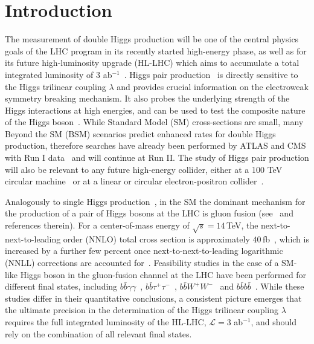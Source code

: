 \section{Introduction}

The measurement of double Higgs production will be one of the central
physics goals of the LHC program in its recently started high-energy
phase, as well as for its future high-luminosity upgrade (HL-LHC)
which aims to accumulate a total integrated
luminosity of 3 ab$^{-1}$~\cite{ATLAS:2013hta,CMS:2013xfa}.
%
Higgs pair production~\cite{baglio} is directly sensitive to the
Higgs trilinear coupling $\lambda$ and 
provides crucial
information on the electroweak symmetry breaking mechanism.
%
It also probes the underlying strength of the Higgs interactions
at high energies, and can be used to test the composite nature of the 
Higgs boson~\cite{Giudice:2007fh,Contino:2010mh}.
%
While Standard Model (SM) cross-sections are small,
many Beyond the SM (BSM)
scenarios predict enhanced rates for double Higgs production, therefore searches have already been performed by ATLAS and CMS with Run I data~\cite{Aad:2015xja,Aad:2015uka,Aad:2014yja,Khachatryan:2015yea,Chatrchyan:2011wt}
and will continue at Run II.
%
The study of Higgs pair production will also be relevant to
any future high-energy 
collider, either at a 100 TeV circular machine~\cite{Arkani-Hamed:2015vfh,Barr:2014sga,Papaefstathiou:2015iba,Azatov:2015oxa} or at
a linear or circular electron-positron collider~\cite{Contino:2013gna}.

Analogously to single Higgs production~\cite{Dittmaier:2012vm}, 
in the SM the dominant mechanism for the production of a pair of
Higgs bosons at the LHC is 
gluon fusion (see~\cite{baglio,Frederix:2014hta} and
references therein).
%
For a center-of-mass energy of $\sqrt{s} = 14\,$TeV, the
next-to-next-to-leading order (NNLO)
total cross section is approximately $40\,$fb~\cite{deFlorian:2013jea},
which is increased by a further few percent once
next-to-next-to-leading logarithmic
(NNLL) corrections
are accounted for~\cite{deFlorian:2015moa}.
%
Feasibility studies in the case of a SM-like Higgs boson
in the gluon-fusion channel
at the LHC have been performed for different final states, including
$b\bar b\gamma\gamma$~\cite{Baur:2003gp,Barger:2013jfa},
$b\bar{b}\tau^+\tau^-$~\cite{Baur:2003gpa,Barr:2013tda,Dolan:2012rv,Dolan:2013rja},
$b\bar{b}W^+W^-$~\cite{Dolan:2012rv,Papaefstathiou:2012qe} and
$b\bar{b}b\bar{b}$~\cite{Baur:2003gpa,Dolan:2012rv,Wardrope:2014kya,deLima:2014dta,Barger:2013jfa}.
%
While these studies differ in their quantitative conclusions,
a consistent picture emerges 
that the ultimate precision in the determination of the Higgs trilinear
coupling $\lambda$ requires the full integrated luminosity
of the HL-LHC, $\mathcal{L}=3$ ab$^{-1}$,
and should rely on the combination of all relevant final states.


